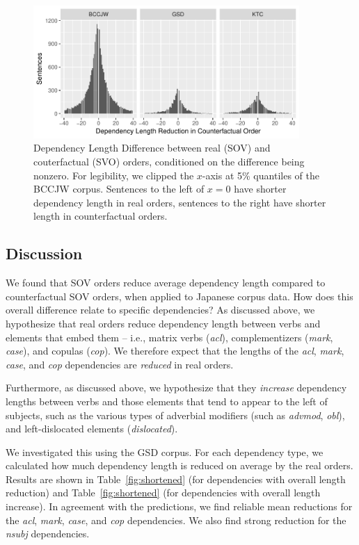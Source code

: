 \documentclass[11pt,a4paper]{article}
\begin{document}
\begin{figure}
    \centering
    \includegraphics[width=0.9\textwidth]{figures/dependency_lentgh_differences_byCorpus.pdf}
\caption{Dependency Length Difference between real (SOV) and couterfactual (SVO) orders, conditioned on the difference being nonzero. For legibility, we clipped the $x$-axis at 5\% quantiles of the BCCJW corpus. Sentences to the left of $x=0$ have shorter dependency length in real orders, sentences to the right have shorter length in counterfactual orders. }\label{fig:memsurp-jap}
\end{figure}




\subsection{Discussion}
We found that SOV orders reduce average dependency length compared to counterfactual SOV orders, when applied to Japanese corpus data.
How does this overall difference relate to specific dependencies? 
As discussed above, we hypothesize that real orders reduce dependency length between verbs and elements that embed them -- i.e., matrix verbs (\emph{acl}), complementizers (\emph{mark}, \emph{case}), and copulas (\emph{cop}).
We therefore expect that the lengths of the \emph{acl}, \emph{mark}, \emph{case}, and \emph{cop} dependencies are \emph{reduced} in real orders.

Furthermore, as discussed above, we hypothesize that they \emph{increase} dependency lengths between verbs and those elements that tend to appear to the left of subjects, such as the various types of adverbial modifiers (such as \textit{advmod}, \textit{obl}), and left-dislocated elements (\textit{dislocated}).

We investigated this using the GSD corpus.
For each dependency type, we calculated how much dependency length is reduced on average by the real orders.
Results are shown in Table~\ref{fig:shortened} (for dependencies with overall length reduction) and Table~\ref{fig:shortened} (for dependencies with overall length increase).
In agreement with the predictions, we find reliable mean reductions for the \emph{acl}, \emph{mark}, \emph{case}, and \emph{cop} dependencies.
We also find strong reduction for the \emph{nsubj} dependencies.
\end{document}
